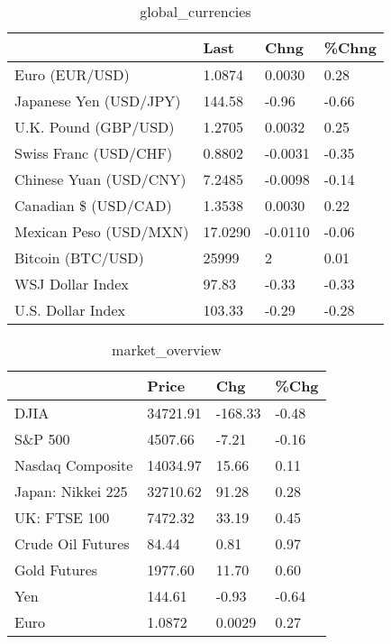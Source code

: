 \documentclass{article}%
\begin{document}
%


\begin{table}[htbp]%
\caption{global\_currencies}%
\centering%
\begin{adjustbox}{width=1\textwidth}%
\begin{tabular}{llll}
\toprule
                       &    Last &    Chng & \%Chng \\
\midrule
        Euro (EUR/USD) &  1.0874 &  0.0030 &  0.28 \\
Japanese Yen (USD/JPY) &  144.58 &   -0.96 & -0.66 \\
  U.K. Pound (GBP/USD) &  1.2705 &  0.0032 &  0.25 \\
 Swiss Franc (USD/CHF) &  0.8802 & -0.0031 & -0.35 \\
Chinese Yuan (USD/CNY) &  7.2485 & -0.0098 & -0.14 \\
  Canadian \$ (USD/CAD) &  1.3538 &  0.0030 &  0.22 \\
Mexican Peso (USD/MXN) & 17.0290 & -0.0110 & -0.06 \\
     Bitcoin (BTC/USD) &   25999 &       2 &  0.01 \\
      WSJ Dollar Index &   97.83 &   -0.33 & -0.33 \\
     U.S. Dollar Index &  103.33 &   -0.29 & -0.28 \\
\bottomrule
\end{tabular}
%
\end{adjustbox}%
\end{table}

%


\begin{table}[htbp]%
\caption{market\_overview}%
\centering%
\begin{adjustbox}{width=1\textwidth}%
\begin{tabular}{llll}
\toprule
                  &    Price &     Chg &  \%Chg \\
\midrule
             DJIA & 34721.91 & -168.33 & -0.48 \\
          S\&P 500 &  4507.66 &   -7.21 & -0.16 \\
 Nasdaq Composite & 14034.97 &   15.66 &  0.11 \\
Japan: Nikkei 225 & 32710.62 &   91.28 &  0.28 \\
     UK: FTSE 100 &  7472.32 &   33.19 &  0.45 \\
Crude Oil Futures &    84.44 &    0.81 &  0.97 \\
     Gold Futures &  1977.60 &   11.70 &  0.60 \\
              Yen &   144.61 &   -0.93 & -0.64 \\
             Euro &   1.0872 &  0.0029 &  0.27 \\
\bottomrule
\end{tabular}
%
\end{adjustbox}%
\end{table}

%
\end{document}
